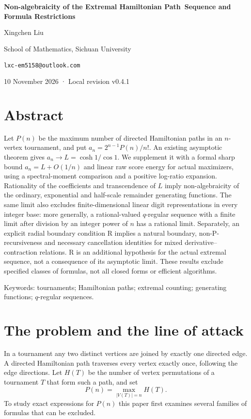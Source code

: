 \documentclass[11pt]{article}
\begin{document}
\begin{center}
{\LARGE\bfseries Non-algebraicity of the Extremal Hamiltonian Path\ Sequence and Formula Restrictions\par}
\vspace{1.2em}
{\large Xingchen Liu\par}
\vspace{0.5em}
{\normalsize School of Mathematics, Sichuan University\par}
{\normalsize \texttt{lxc-em5158@outlook.com}\par}
\vspace{0.5em}
{\small 10 November 2026 · Local revision v0.4.1\par}
\end{center}
\vspace{1em}

\section*{Abstract}
Let $P(n)$ be the maximum number of directed Hamiltonian paths in an $n$-vertex tournament, and put $a_n=2^{n-1}P(n)/n!$. An existing asymptotic theorem gives $a_n\to L=\cosh1/\cos1$. We supplement it with a formal sharp bound $a_n=L+O(1/n)$ and linear raw score energy for actual maximizers, using a spectral-moment comparison and a positive log-ratio expansion. Rationality of the coefficients and transcendence of $L$ imply non-algebraicity of the ordinary, exponential and half-scale remainder generating functions. The same limit also excludes finite-dimensional linear digit representations in every integer base: more generally, a rational-valued $q$-regular sequence with a finite limit after division by an integer power of $n$ has a rational limit. Separately, an explicit radial boundary condition R implies a natural boundary, non-P-recursiveness and necessary cancellation identities for mixed derivative--contraction relations. R is an additional hypothesis for the actual extremal sequence, not a consequence of its asymptotic limit. These results exclude specified classes of formulas, not all closed forms or efficient algorithms.

\noindent Keywords: tournaments; Hamiltonian paths; extremal counting; generating functions; $q$-regular sequences.

\section{The problem and the line of attack}
In a tournament any two distinct vertices are joined by exactly one directed edge. A directed Hamiltonian path traverses every vertex exactly once, following the edge directions. Let $H(T)$ be the number of vertex permutations of a tournament $T$ that form such a path, and set
\[
P(n)=\max_{|V(T)|=n}H(T).
\]
To study exact expressions for $P(n)$ this paper first examines several families of formulas that can be excluded.
\end{document}
